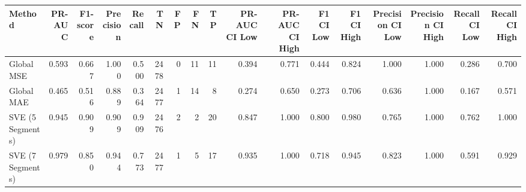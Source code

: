 \begin{tabular}{lrrrrrrrrrrrrrrrr}
\toprule
Method & PR-AUC & F1-score & Precision & Recall & TN & FP & FN & TP & PR-AUC CI Low & PR-AUC CI High & F1 CI Low & F1 CI High & Precision CI Low & Precision CI High & Recall CI Low & Recall CI High \\
\midrule
Global MSE & 0.593 & 0.667 & 1.000 & 0.500 & 2478 & 0 & 11 & 11 & 0.394 & 0.771 & 0.444 & 0.824 & 1.000 & 1.000 & 0.286 & 0.700 \\
Global MAE & 0.465 & 0.516 & 0.889 & 0.364 & 2477 & 1 & 14 & 8 & 0.274 & 0.650 & 0.273 & 0.706 & 0.636 & 1.000 & 0.167 & 0.571 \\
SVE (5 Segments) & 0.945 & 0.909 & 0.909 & 0.909 & 2476 & 2 & 2 & 20 & 0.847 & 1.000 & 0.800 & 0.980 & 0.765 & 1.000 & 0.762 & 1.000 \\
SVE (7 Segments) & 0.979 & 0.850 & 0.944 & 0.773 & 2477 & 1 & 5 & 17 & 0.935 & 1.000 & 0.718 & 0.945 & 0.823 & 1.000 & 0.591 & 0.929 \\
\bottomrule
\end{tabular}
